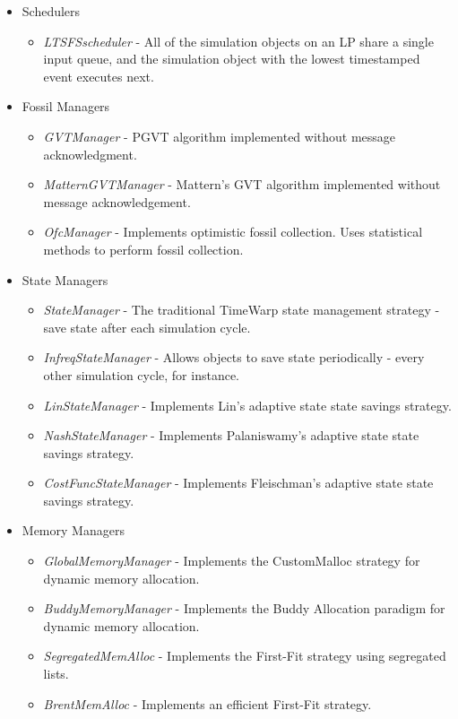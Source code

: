 \documentclass[11pt]{report}
\begin{document}
\begin{itemize}

\item
Schedulers

\begin{itemize}	
\item
{\it LTSFSscheduler} - All of the simulation objects on an LP share a
single input queue, and the simulation object with the lowest
timestamped event executes next.
\end{itemize}

\item
Fossil Managers

\begin{itemize}
\item
{\it GVTManager} - PGVT algorithm implemented without message
acknowledgment.
\item
{\it MatternGVTManager} - Mattern's GVT algorithm implemented without
message acknowledgement.
\item
{\it OfcManager} - Implements optimistic fossil collection.  Uses
statistical methods to perform fossil collection.
\end{itemize}

\item
State Managers

\begin{itemize}
\item
{\it StateManager} - The traditional TimeWarp state management strategy
- save state after each simulation cycle.
\item
{\it InfreqStateManager} - Allows objects to save state periodically -
every other simulation cycle, for instance.
\item
{\it LinStateManager} - Implements Lin's adaptive state state savings strategy.
\item
{\it NashStateManager} - Implements Palaniswamy's adaptive state state
savings strategy.
\item
{\it CostFuncStateManager} - Implements Fleischman's adaptive state state
savings strategy.
\end{itemize}

\item
Memory Managers

\begin{itemize}
\item
{\it GlobalMemoryManager} - Implements the CustomMalloc strategy for
dynamic memory allocation.
\item
{\it BuddyMemoryManager} - Implements the Buddy Allocation paradigm for
dynamic memory allocation.
\item
{\it SegregatedMemAlloc} - Implements the First-Fit strategy using
segregated lists.
\item
{\it BrentMemAlloc} - Implements an efficient First-Fit strategy.
\end{itemize}


\end{itemize}
\end{document}

